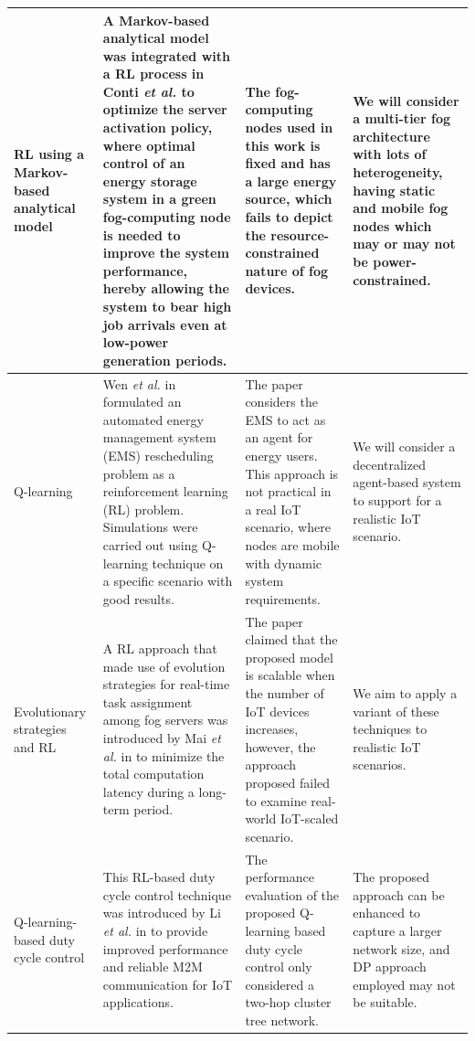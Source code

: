 \documentclass[journal]{IEEEtran}
\begin{document}
\begin{landscape}
\begin{table}
\begin{tabular}{llll}
\multicolumn{1}{m{3cm}}{RL using a Markov-based analytical model} & \multicolumn{1}{m{6cm}}{A Markov-based analytical model was integrated with a RL process in Conti \emph{et al.} \cite{Conti2017} to optimize the server activation policy, where optimal control of an energy storage system in a green fog-computing node is needed to improve the system performance, hereby allowing the system to bear high job arrivals even at low-power generation periods.} & \multicolumn{1}{m{6cm}}{The fog-computing nodes used in this work is fixed and has a large energy source, which fails to depict the resource-constrained nature of fog devices.} & \multicolumn{1}{m{6cm}}{We will consider a multi-tier fog architecture with lots of heterogeneity, having static and mobile fog nodes which may or may not be power-constrained.}\\ \hline


\multicolumn{1}{m{3cm}}{Q-learning} & \multicolumn{1}{m{6cm}}{Wen \emph{et al.} in \cite{Wen15} formulated an automated energy management system (EMS) rescheduling problem as a reinforcement learning (RL) problem. Simulations were carried out using Q-learning technique on a specific scenario with good results.} & \multicolumn{1}{m{6cm}}{The paper considers the EMS to act as an agent for energy users. This approach is not practical in a real IoT scenario, where nodes are mobile with dynamic system requirements.} & \multicolumn{1}{m{6cm}}{We will consider a decentralized agent-based system to support for a realistic IoT scenario.}\\ \hline


\multicolumn{1}{m{3cm}}{Evolutionary strategies and RL} & \multicolumn{1}{m{6cm}}{A RL approach that made use of evolution strategies for real-time task assignment among fog servers was introduced by Mai \emph{et al.} in \cite{Mai2018} to minimize the total computation latency during a long-term period.} & \multicolumn{1}{m{6cm}}{The paper claimed that the proposed model is scalable when the number of IoT devices increases, however, the approach proposed failed to examine real-world IoT-scaled scenario.} & \multicolumn{1}{m{6cm}}{We aim to apply a variant of these techniques to realistic IoT scenarios.}\\ \hline

\multicolumn{1}{m{3cm}}{Q-learning-based duty cycle control} & \multicolumn{1}{m{6cm}}{This RL-based duty cycle control technique was introduced by Li \emph{et al.} in \cite{Li2015} to provide improved performance and reliable M2M communication for IoT applications.} & \multicolumn{1}{m{6cm}}{The performance evaluation  of the proposed Q-learning based duty cycle control only considered a two-hop cluster tree network.} & \multicolumn{1}{m{6cm}}{The proposed approach can be enhanced to capture a larger network size, and DP approach employed may not be suitable.}\\ \hline



\end{tabular}
\end{table}
\end{landscape}
\end{document}
